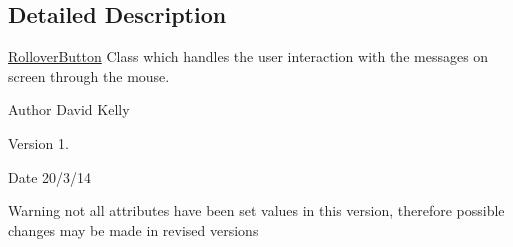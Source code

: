 \subsection{Detailed Description}
\hyperlink{class_rollover_button}{Rollover\-Button} Class which handles the user interaction with the messages on screen through the mouse. 

\begin{DoxyAuthor}{Author}
David Kelly 
\end{DoxyAuthor}
\begin{DoxyVersion}{Version}
1. 
\end{DoxyVersion}
\begin{DoxyDate}{Date}
20/3/14
\end{DoxyDate}
\begin{DoxyWarning}{Warning}
not all attributes have been set values in this version, therefore possible changes may be made in revised versions 
\end{DoxyWarning}


